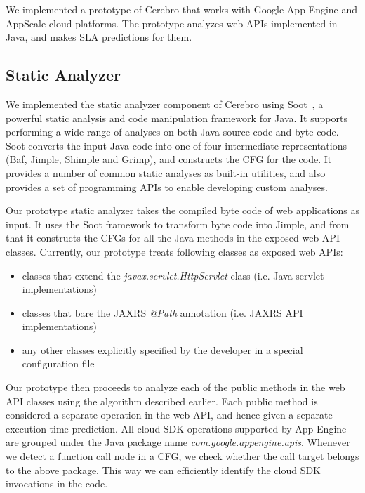 We implemented a prototype of Cerebro that works with Google App Engine and AppScale cloud platforms.
The prototype analyzes web APIs implemented in Java, and makes SLA predictions for them.

\subsection{Static Analyzer}
We implemented the static analyzer component of Cerebro using Soot~\cite{Vallee-Rai:2010:SJB:1925805.1925818}, a powerful
static analysis and code manipulation framework for Java. It supports performing a wide range of analyses on both Java source
code and byte code. Soot converts the input Java code into one of four intermediate representations (Baf, Jimple,
 Shimple and Grimp), and constructs the CFG for the code. It provides a number of common static
 analyses as built-in utilities, and also provides a set of programming APIs to enable developing custom
 analyses.
 
Our prototype static analyzer takes the compiled byte code of web applications as input. It uses the
Soot framework to transform byte code into Jimple, and from that it constructs the CFGs for 
all the Java methods in the exposed web API classes. Currently, our
prototype treats following classes as exposed web APIs:

\begin{itemize}
\item classes that extend the \textit{javax.servlet.HttpServlet} class (i.e. Java servlet implementations)
\item classes that bare the JAXRS \textit{@Path} annotation (i.e. JAXRS API implementations)
\item any other classes explicitly specified by the developer in a special configuration file
\end{itemize}
 
Our prototype then proceeds to analyze each of the public methods in the web API classes
using the algorithm described earlier. Each public method is considered a separate operation
in the web API, and hence given a separate execution time prediction.
All cloud SDK operations supported by App Engine
are grouped under the Java package name \textit{com.google.appengine.apis}. Whenever we detect
a function call node in a CFG, we check whether the call target belongs to the above package.
This way we can efficiently identify the cloud SDK invocations in the code.

